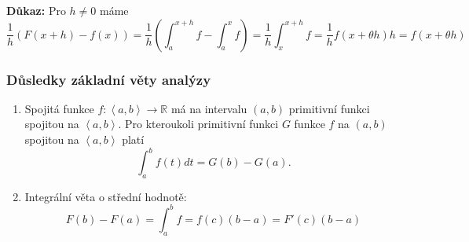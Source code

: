 \documentclass[../main.tex]{subfiles}
\begin{document}
\vspace{5mm}
\noindent
\textbf{Důkaz:}
Pro $h\neq 0$ máme
\[ \frac{1}{h}(F(x+h) - f(x)) =\frac{1}{h}\left( \int_{a}^{x+h} f - \int_{a}^{x} f \right) =
\frac{1}{h} \int_{x}^{x+h} f = \frac{1}{h}f(x + \theta h)h = f(x + \theta h) \]

\subsubsection{Důsledky základní věty analýzy}
\hspace{1.2mm}
\begin{enumerate}
    \item Spojitá funkce $f : \left<a,b\right> \rightarrow \mathbb{R}$ má na intervalu $(a,b)$ primitivní funkci spojitou na $\left<a,b\right>$.
          Pro kteroukoli primitivní funkci $G$ funkce $f$ na $(a,b)$ spojitou na $\left<a,b\right>$ platí
          \[\int^b_a f(t)dt = G(b) - G(a).\]
    \item Integrální věta o střední hodnotě:
    \[F(b) - F(a) = \int^b_a f = f(c)(b-a) = F'(c)(b-a)\]
\end{enumerate}
\noindent
\end{document}

